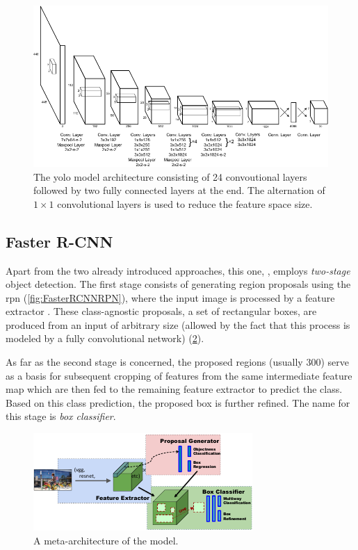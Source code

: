 \begin{figure}[t]
    \centerline{\includegraphics[width=0.8\linewidth]{figures/theoretical_foundations/yolo_architecture.pdf}}
    \caption[\Gls{yolo} architecture]{The \gls{yolo} model architecture consisting of 24 convoutional layers followed by two fully connected layers at the end. The alternation of $1 \times 1$ convolutional layers is used to reduce the feature space size. }
    \label{fig:YOLOArchitecture}
\end{figure}

\subsection{Faster R-CNN}
\label{ssec:FasterRCNN}

Apart from the two already introduced approaches, this one, , employs \emph{two-stage} object detection. The first stage consists of generating region proposals using the \gls{rpn} \cite{Ren2017} (\cref{fig:FasterRCNNRPN}), where the input image is processed by a feature extractor \cite{Huang2017}. These class-agnostic proposals, a set of rectangular boxes, are produced from an input of arbitrary size (allowed by the fact that this process is modeled by a fully convolutional network) (\cref{fig:FasterRCNNMetaArch}).

As far as the second stage is concerned, the proposed regions (usually $300$) serve as a basis for subsequent cropping of features from the same intermediate feature map which are then fed to the remaining feature extractor to predict the class. Based on this class prediction, the proposed box is further refined. The name for this stage is \emph{box classifier}.

\begin{figure}[t]
    \centerline{\includegraphics[width=0.7\linewidth]{figures/theoretical_foundations/faster_rcnn_metaarchitecture.pdf}}
    \caption[ meta-architecture]{A meta-architecture of the  model. }
    \label{fig:FasterRCNNMetaArch}
\end{figure}


